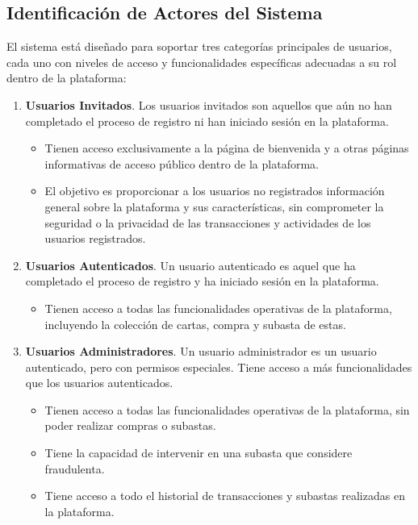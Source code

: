 \subsection{Identificación de Actores del Sistema} \label{sec:6_1-Identificacion_actores}
\hypertarget{sec:6_1-Identificacion_actores}{}

El sistema está diseñado para soportar tres categorías principales de usuarios, cada uno con niveles de acceso y funcionalidades específicas adecuadas a su rol dentro de la plataforma:
\begin{enumerate}
    \item \textbf{Usuarios Invitados}. 
    Los usuarios invitados son aquellos que aún no han completado el proceso de registro ni han iniciado sesión en la plataforma. 
    \begin{itemize}
        \item Tienen acceso exclusivamente a la página de bienvenida y a otras páginas informativas de acceso público dentro de la plataforma.
        \item El objetivo es proporcionar a los usuarios no registrados información general sobre la plataforma y sus características, sin comprometer la seguridad o la privacidad de las transacciones y actividades de los usuarios registrados.
   \end{itemize}
    
    \item \textbf{Usuarios Autenticados}.
    Un usuario autenticado es aquel que ha completado el proceso de registro y ha iniciado sesión en la plataforma.
    \begin{itemize}
        \item Tienen acceso a todas las funcionalidades operativas de la plataforma, incluyendo la colección de cartas, compra y subasta de estas.
    \end{itemize}
    
    \item \textbf{Usuarios Administradores}.
    Un usuario administrador es un usuario autenticado, pero con permisos especiales. Tiene acceso a más funcionalidades que los usuarios autenticados.
    \begin{itemize}
        \item Tienen acceso a todas las funcionalidades operativas de la plataforma, sin poder realizar compras o subastas.
        \item Tiene la capacidad de intervenir en una subasta que considere fraudulenta.
        \item Tiene acceso a todo el historial de transacciones y subastas realizadas en la plataforma.
    \end{itemize}
\end{enumerate}